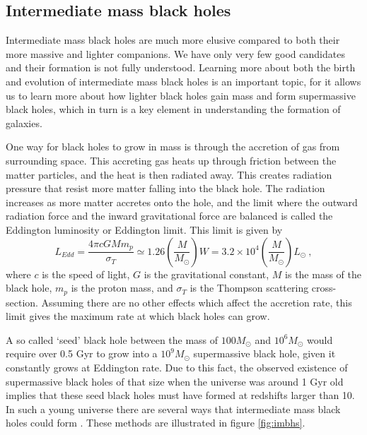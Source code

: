 \documentclass[english, oneside]{HYgradu}
\begin{document}


\subsection{Intermediate mass black holes}

Intermediate mass black holes are much more elusive compared to both their more massive and lighter companions. We have only very few good candidates and their formation is not fully understood. Learning more about both the birth and evolution of intermediate mass black holes is an important topic, for it allows us to learn more about how lighter black holes gain mass and form supermassive black holes, which in turn is a key element in understanding the formation of galaxies.

One way for black holes to grow in mass is through the accretion of gas from surrounding space. This accreting gas heats up through friction between the matter particles, and the heat is then radiated away. This creates radiation pressure that resist more matter falling into the black hole. The radiation increases as more matter accretes onto the hole, and the limit where the outward radiation force and the inward gravitational force are balanced is called the Eddington luminosity or Eddington limit. This limit is given by
\begin{equation}
L_{Edd} = \frac{4 \pi c G M m_p}{\sigma_T} \simeq 1.26 \left( \frac{M}{M_\odot} \right) W = 3.2 \times 10^4 \left( \frac{M}{M_\odot} \right) L_\odot \ ,
\end{equation}
where $c$ is the speed of light, $G$ is the gravitational constant, $M$ is the mass of the black hole, $m_p$ is the proton mass, and $\sigma_T$ is the Thompson scattering cross-section. Assuming there are no other effects which affect the accretion rate, this limit gives the maximum rate at which black holes can grow. 

A so called `seed' black hole between the mass of $100 M_\odot$ and $10^6 M_\odot$ would require over 0.5 Gyr to grow into a $10^9 M_\odot$ supermassive black hole, given it constantly grows at Eddington rate. Due to this fact, the observed existence of supermassive black holes of that size when the universe was around 1 Gyr old implies that these seed black holes must have formed at redshifts larger than 10. In such a young universe there are several ways that intermediate mass black holes could form \citep{mezcua:2017}. These methods are illustrated in figure \ref{fig:imbhs}.
\end{document}
